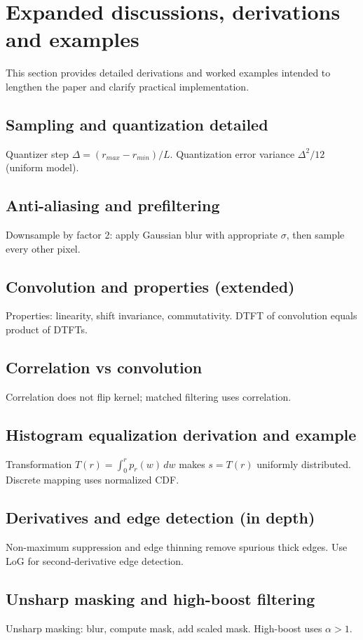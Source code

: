 \documentclass[12pt,a4paper]{article}
\begin{document}
\section{Expanded discussions, derivations and examples}
This section provides detailed derivations and worked examples intended to lengthen the paper and clarify practical implementation.

\subsection{Sampling and quantization detailed}
Quantizer step $\Delta=(r_{max}-r_{min})/L$. Quantization error variance $\Delta^2/12$ (uniform model).

\subsection{Anti-aliasing and prefiltering}
Downsample by factor 2: apply Gaussian blur with appropriate $\sigma$, then sample every other pixel.

\subsection{Convolution and properties (extended)}
Properties: linearity, shift invariance, commutativity. DTFT of convolution equals product of DTFTs.

\subsection{Correlation vs convolution}
Correlation does not flip kernel; matched filtering uses correlation.

\subsection{Histogram equalization derivation and example}
Transformation $T(r)=\int_0^r p_r(w)\,dw$ makes $s=T(r)$ uniformly distributed. Discrete mapping uses normalized CDF.

\subsection{Derivatives and edge detection (in depth)}
Non-maximum suppression and edge thinning remove spurious thick edges. Use LoG for second-derivative edge detection.

\subsection{Unsharp masking and high-boost filtering}
Unsharp masking: blur, compute mask, add scaled mask. High-boost uses $\alpha>1$.
\end{document}
